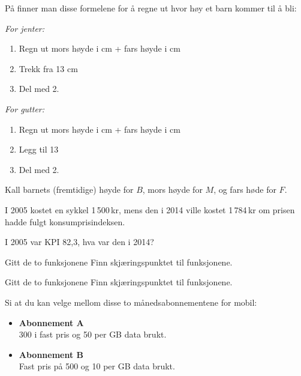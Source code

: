 På
 finner man disse formelene for å regne ut hvor høy et barn kommer til å bli:\os

\textit{For jenter:}
\begin{enumerate}
	\item Regn ut mors høyde i cm + fars høyde i cm
	\item Trekk fra 13 cm
	\item Del med 2.
\end{enumerate}

\textit{For gutter:}
\begin{enumerate}
	\item Regn ut mors høyde i cm + fars høyde i cm
	\item Legg til 13 
	\item Del med 2.
\end{enumerate}
Kall barnets (fremtidige) høyde for $ B $, mors høyde for $ M $, og fars høde for $ F $.

I 2005 kostet en sykkel 1\,500\,kr, mens den i 2014 ville kostet 1\,784\,kr om prisen hadde fulgt konsumprisindeksen. \os

I 2005 var KPI 82,3, hva var den i 2014?

\nes
{}
Gitt de to funksjonene
Finn skjæringspunktet til funksjonene.

Gitt de to funksjonene
Finn skjæringspunktet til funksjonene.

Si at du kan velge mellom disse to månedsabonnementene for mobil:
\begin{itemize}
	\item \textbf{Abonnement A} \\
	300 i fast pris og 50 per GB data brukt.
	\item \textbf{Abonnement B} \\
	Fast pris på 500 og 10 per GB data brukt.
\end{itemize}

